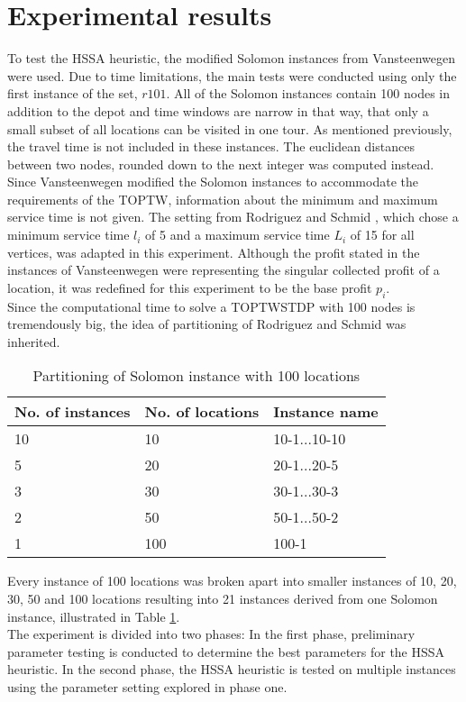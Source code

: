\documentclass[final,5p,times,twocolumn]{elsarticle}
\begin{document}
{{\section{Experimental results}
To test the HSSA heuristic, the modified Solomon instances from Vansteenwegen \cite{Vansteenwegen:2009ils} were used. Due to time limitations, the main tests were conducted using only the first instance of the set, $r101$. All of the Solomon instances contain 100 nodes in addition to the depot and time windows are narrow in that way, that only a small subset of all locations can be visited in one tour. As mentioned previously, the travel time is not included in these instances. The euclidean distances between two nodes, rounded down to the next integer was computed instead. Since Vansteenwegen \cite{Vansteenwegen:2009ils} modified the Solomon instances to accommodate the requirements of the TOPTW, information about the minimum and maximum service time is not given. The setting from Rodriguez and Schmid \cite{Rodriguez:2013}, which chose a minimum service time $l_{i}$ of 5 and a maximum service time $L_{i}$ of 15 for all vertices, was adapted in this experiment. Although the profit stated in the instances of Vansteenwegen \cite{Vansteenwegen:2009ils} were representing the singular collected profit of a location, it was redefined for this experiment to be the base profit $p_{i}$. \\
Since the computational time to solve a TOPTWSTDP with 100 nodes is tremendously big, the idea of partitioning of Rodriguez and Schmid \cite{Rodriguez:2013} was inherited.  

{\renewcommand{\arraystretch}{1.2}
\begin{table}[htbp]
\caption{Partitioning of Solomon instance with 100 locations}
\centering
\begin{tabularx}{\linewidth}{X l l}
\hline 
No. of instances & No. of locations & Instance name\\
\hline
10& 10& 10-1...10-10\\
5& 20& 20-1...20-5\\
3& 30& 30-1...30-3\\
2& 50& 50-1...50-2\\
1& 100& 100-1\\
\hline
\end{tabularx}
\label{tab:r101split}
\end{table} 
Every instance of 100 locations was broken apart into smaller instances of 10, 20, 30, 50 and 100 locations resulting into 21 instances derived from one Solomon instance, illustrated in Table \ref{tab:r101split}.\\
The experiment is divided into two phases: In the first phase, preliminary parameter testing is conducted to determine the best parameters for the HSSA heuristic. In the second phase, the HSSA heuristic is tested on multiple instances using the parameter setting explored in phase one.

}}}
\end{document}
